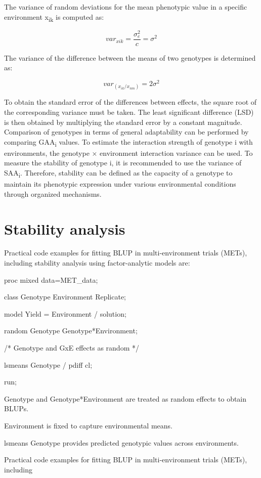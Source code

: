 \documentclass[
]{article}
\begin{document}
The variance of random deviations for the mean phenotypic value in a
specific environment x\textsubscript{ik} is computed as:

\[{var}_{xik} = \frac{\sigma_{e}^{2}}{c} = \sigma^{2}\]

The variance of the difference between the means of two genotypes is
determined as:

\[{var}_{(x_{ik}/x_{nm})} = 2\sigma^{2}\]

To obtain the standard error of the differences between effects, the
square root of the corresponding variance must be taken. The least
significant difference (LSD) is then obtained by multiplying the
standard error by a constant magnitude. Comparison of genotypes in terms
of general adaptability can be performed by comparing
GAA\textsubscript{i} values. To estimate the interaction strength of
genotype i with environments, the genotype × environment interaction
variance can be used. To measure the stability of genotype i, it is
recommended to use the variance of SAA\textsubscript{i}. Therefore,
stability can be defined as the capacity of a genotype to maintain its
phenotypic expression under various environmental conditions through
organized mechanisms.

\hypertarget{stability-analysis}{%
\section{Stability analysis}\label{stability-analysis}}

Practical code examples for fitting BLUP in multi-environment trials
(METs), including stability analysis using factor-analytic models are:

proc mixed data=MET\_data;

class Genotype Environment Replicate;

model Yield = Environment / solution;

random Genotype Genotype*Environment;

/* Genotype and GxE effects as random */

lsmeans Genotype / pdiff cl;

run;

Genotype and Genotype*Environment are treated as random effects to
obtain BLUPs.

Environment is fixed to capture environmental means.

lsmeans Genotype provides predicted genotypic values across
environments.

Practical code examples for fitting BLUP in multi-environment trials
(METs), including
\end{document}
